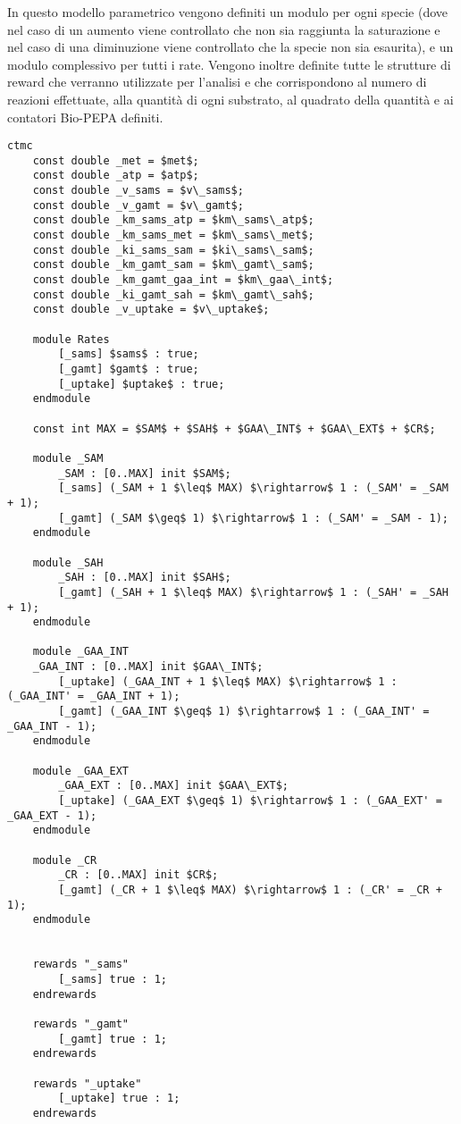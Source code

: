 In questo modello parametrico vengono definiti un modulo per ogni specie (dove nel caso di un aumento viene controllato che non sia raggiunta la saturazione e nel caso di una diminuzione viene controllato che la specie non sia esaurita), e un modulo complessivo per tutti i rate.
Vengono inoltre definite tutte le strutture di reward che verranno utilizzate per l'analisi e che corrispondono al numero di reazioni effettuate, alla quantit\`a di ogni substrato, al quadrato della quantit\`a e ai contatori Bio-PEPA definiti.

\begin{lstlisting}[mathescape=true,language=prism]
ctmc
	const double _met = $met$;
	const double _atp = $atp$;
	const double _v_sams = $v\_sams$;
	const double _v_gamt = $v\_gamt$;
	const double _km_sams_atp = $km\_sams\_atp$;
	const double _km_sams_met = $km\_sams\_met$;
	const double _ki_sams_sam = $ki\_sams\_sam$;
	const double _km_gamt_sam = $km\_gamt\_sam$;
	const double _km_gamt_gaa_int = $km\_gaa\_int$;
	const double _ki_gamt_sah = $km\_gamt\_sah$;
	const double _v_uptake = $v\_uptake$;
	
	module Rates
		[_sams] $sams$ : true;
		[_gamt] $gamt$ : true;
		[_uptake] $uptake$ : true;
	endmodule
	
	const int MAX = $SAM$ + $SAH$ + $GAA\_INT$ + $GAA\_EXT$ + $CR$;
	
	module _SAM
		_SAM : [0..MAX] init $SAM$;
		[_sams] (_SAM + 1 $\leq$ MAX) $\rightarrow$ 1 : (_SAM' = _SAM + 1);
		[_gamt] (_SAM $\geq$ 1) $\rightarrow$ 1 : (_SAM' = _SAM - 1);
	endmodule
	
	module _SAH
		_SAH : [0..MAX] init $SAH$;
		[_gamt] (_SAH + 1 $\leq$ MAX) $\rightarrow$ 1 : (_SAH' = _SAH + 1);
	endmodule
	
	module _GAA_INT
	_GAA_INT : [0..MAX] init $GAA\_INT$;
		[_uptake] (_GAA_INT + 1 $\leq$ MAX) $\rightarrow$ 1 : (_GAA_INT' = _GAA_INT + 1);
		[_gamt] (_GAA_INT $\geq$ 1) $\rightarrow$ 1 : (_GAA_INT' = _GAA_INT - 1);
	endmodule
	
	module _GAA_EXT
		_GAA_EXT : [0..MAX] init $GAA\_EXT$;
		[_uptake] (_GAA_EXT $\geq$ 1) $\rightarrow$ 1 : (_GAA_EXT' = _GAA_EXT - 1);
	endmodule
	
	module _CR
		_CR : [0..MAX] init $CR$;
		[_gamt] (_CR + 1 $\leq$ MAX) $\rightarrow$ 1 : (_CR' = _CR + 1);
	endmodule
	
	
	rewards "_sams"
		[_sams] true : 1;
	endrewards
	
	rewards "_gamt"
		[_gamt] true : 1;
	endrewards
	
	rewards "_uptake"
		[_uptake] true : 1;
	endrewards
	

\end{lstlisting}
